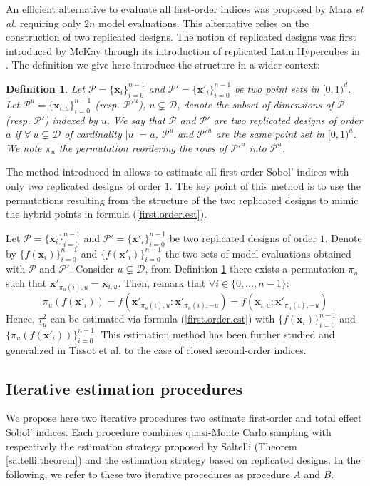 \documentclass[]{elsarticle}
\newtheorem{definition}{Definition}
\theoremstyle{definition}
\newcommand{\bvec}[1]{\boldsymbol{#1}}
\newcommand{\vx}{\bvec{x}}
\begin{document}
An efficient alternative to evaluate all first-order indices was proposed by Mara \textit{et al.} \cite{Mara}  requiring only $2n$ model evaluations. This alternative relies on the construction of two replicated designs. The notion of replicated designs was first introduced by McKay through its introduction of replicated Latin Hypercubes in \cite{Mckay}. The definition we give here introduce the structure in a wider context:
\begin{definition}
\label{rep.designs}
Let $\mathcal{P}=\{\vx_i\}_{i=0}^{n-1}$ and $\mathcal{P}'=\{{\vx'}_i\}_{i=0}^{n-1}$ be two point sets in
$[0,1)^{d}$. Let $\mathcal{P}^u=\{\vx_{i,u}\}_{i=0}^{n-1}$ (resp. ${\mathcal{P}'}^u$), $u \subsetneq \mathcal{D}$, denote the subset of dimensions of $\mathcal{P}$ (resp. $\mathcal{P}'$) indexed by $u$. We say that $\mathcal{P}$ and $\mathcal{P}'$ are two replicated designs of order $a$ if $\forall \ u \subsetneq \mathcal{D}$ of cardinality $|u|=a$, $\mathcal{P}^u$ and ${\mathcal{P}'}^u$ are the same point set in $[0,1)^a$. We note $\pi_u$ the permutation reordering the rows of ${\mathcal{P}'}^u$ into $\mathcal{P}^u$.
\end{definition}
The method introduced in \cite{Mara} allows to estimate all first-order Sobol' indices with only two replicated designs of order $1$. The key point of this method is to use the permutations resulting from the structure of the two replicated designs to mimic the hybrid points in formula (\ref{first.order.est}). 

Let $\mathcal{P}=\{\vx_i\}_{i=0}^{n-1}$ and $\mathcal{P}'=\{{\vx'}_i\}_{i=0}^{n-1}$ be two replicated designs of order $1$. Denote by $\{f(\vx_i)\}_{i=0}^{n-1}$ and $\{f({\vx'}_i)\}_{i=0}^{n-1}$ the two sets of model evaluations obtained with $\mathcal{P}$ and $\mathcal{P}'$. Consider $u \subsetneq \mathcal{D}$, from Definition \ref{rep.designs} there exists a permutation $\pi_u$ such that ${\vx'}_{\pi_u(i),u}={\vx}_{i,u}$. Then, remark that $\forall i \in \{0,\dots,n-1\}$:
\[\pi_u(f({\vx'}_i))=f(\vx'_{\pi_u(i),u}:{\vx'}_{\pi_u(i),-u})=f(\vx_{i,u}:{\vx'}_{\pi_u(i),-u})\]
Hence, $\underline{\tau}^2_u$ can be estimated via formula (\ref{first.order.est}) with $\{f(\vx_i)\}_{i=0}^{n-1}$ and $\{\pi_u(f({\vx'}_i))\}_{i=0}^{n-1}$. This estimation method has been further studied and generalized in Tissot et al. \cite{Mara} to the case of closed second-order indices.
\bigskip

\subsection{Iterative estimation procedures}
We propose here two iterative procedures two estimate first-order and total effect Sobol' indices. Each procedure combines quasi-Monte Carlo sampling with respectively the estimation strategy proposed by Saltelli (Theorem \ref{saltelli.theorem}) and the estimation strategy based on replicated designs. In the following, we refer to these two iterative procedures as procedure $A$ and $B$.
\bigskip
\end{document}
